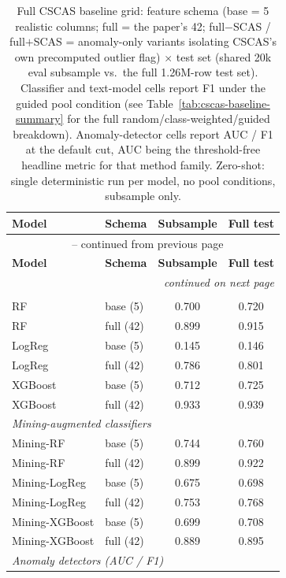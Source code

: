 \begin{longtable}{llcc}
\caption{Full CSCAS baseline grid: feature schema (base = 5 realistic columns;
full = the paper's 42; full$-$SCAS / full$+$SCAS = anomaly-only variants
isolating CSCAS's own precomputed outlier flag) $\times$ test set (shared 20k
eval subsample vs.\ the full 1.26M-row test set). Classifier and text-model
cells report F1 under the guided pool condition (see
Table~\ref{tab:cscas-baseline-summary} for the full random/class-weighted/guided
breakdown). Anomaly-detector cells report AUC / F1 at the default cut, AUC
being the threshold-free headline metric for that method family. Zero-shot:
single deterministic run per model, no pool conditions, subsample only.}
\label{tab:cscas-full-grid} \\
\toprule
\textbf{Model} & \textbf{Schema} & \textbf{Subsample} & \textbf{Full test} \\
\midrule
\endfirsthead
\multicolumn{4}{c}{\tablename\ \thetable{} -- continued from previous page} \\
\toprule
\textbf{Model} & \textbf{Schema} & \textbf{Subsample} & \textbf{Full test} \\
\midrule
\endhead
\midrule \multicolumn{4}{r}{\textit{continued on next page}} \\
\endfoot
\bottomrule
\endlastfoot
\multicolumn{4}{l}{\textit{Classifiers}} \\
RF & base (5) & 0.700 & 0.720 \\
RF & full (42) & 0.899 & 0.915 \\
LogReg & base (5) & 0.145 & 0.146 \\
LogReg & full (42) & 0.786 & 0.801 \\
XGBoost & base (5) & 0.712 & 0.725 \\
XGBoost & full (42) & 0.933 & 0.939 \\[2pt]
\multicolumn{4}{l}{\textit{Mining-augmented classifiers}} \\
Mining-RF & base (5) & 0.744 & 0.760 \\
Mining-RF & full (42) & 0.899 & 0.922 \\
Mining-LogReg & base (5) & 0.675 & 0.698 \\
Mining-LogReg & full (42) & 0.753 & 0.768 \\
Mining-XGBoost & base (5) & 0.699 & 0.708 \\
Mining-XGBoost & full (42) & 0.889 & 0.895 \\[2pt]
\multicolumn{4}{l}{\textit{Anomaly detectors (AUC / F1)}} \\

\end{longtable}
